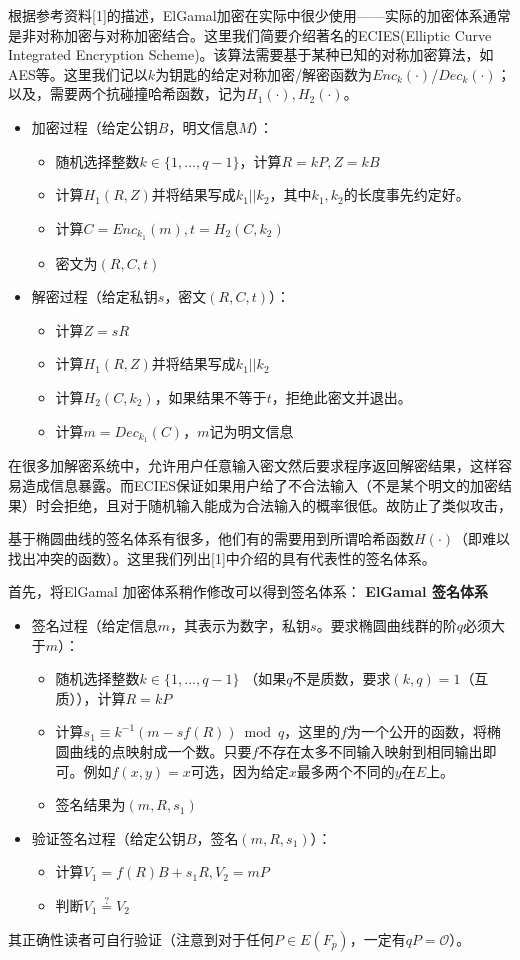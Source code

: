 \documentclass[12pt]{article}
\newcommand{\ec}{椭圆曲线}
\newcommand{\oo}{\mathcal{O}}
\begin{document}
根据参考资料[1]的描述，ElGamal加密在实际中很少使用——实际的加密体系通常是非对称加密与对称加密结合。这里我们简要介绍著名的ECIES(Elliptic Curve Integrated Encryption Scheme)。该算法需要基于某种已知的对称加密算法，如AES等。这里我们记以$k$为钥匙的给定对称加密/解密函数为$Enc_k(\cdot)$/$Dec_k(\cdot)$；以及，需要两个抗碰撞哈希函数，记为$H_1(\cdot),H_2(\cdot)$。
\begin{itemize}
	\item 加密过程（给定公钥$B$，明文信息$M$）：
	\begin{itemize}
		\item 随机选择整数$k \in \{1,...,q-1\}$，计算$R=kP, Z=kB$
        \item 计算$H_1(R,Z)$并将结果写成$k_1||k_2$，其中$k_1,k_2$的长度事先约定好。
        \item 计算$C=Enc_{k_1}(m),t = H_2(C,k_2)$
        \item 密文为$(R,C,t)$
   \end{itemize}
	\item 解密过程（给定私钥$s$，密文$(R,C,t)$）：
	\begin{itemize}
		\item 计算$Z=	sR$
		\item 计算$H_1(R,Z)$并将结果写成$k_1||k_2$
		\item 计算$H_2(C,k_2)$，如果结果不等于$t$，拒绝此密文并退出。
		\item 计算$m=Dec_{k_1}(C)$，$m$记为明文信息
	\end{itemize}
\end{itemize}
在很多加解密系统中，允许用户任意输入密文然后要求程序返回解密结果，这样容易造成信息暴露。而ECIES保证如果用户给了不合法输入（不是某个明文的加密结果）时会拒绝，且对于随机输入能成为合法输入的概率很低。故防止了类似攻击，

基于\ec 的签名体系有很多，他们有的需要用到所谓哈希函数$H(\cdot)$（即难以找出冲突的函数）。这里我们列出[1]中介绍的具有代表性的签名体系。

首先，将ElGamal 加密体系稍作修改可以得到签名体系：
\textbf{ElGamal 签名体系}
\begin{itemize}
	\item 签名过程（给定信息$m$，其表示为数字，私钥$s$。要求\ec 群的阶$q$必须大于$m$）：
	\begin{itemize}
		\item 随机选择整数$k \in \{1,...,q-1\}$ （如果$q$不是质数，要求$(k,q)=1$（互质）），计算$R=kP$
		\item 计算$s_1 \equiv k^{-1}(m-sf(R)) \bmod q$，这里的$f$为一个公开的函数，将\ec 的点映射成一个数。只要$f$不存在太多不同输入映射到相同输出即可。例如$f(x,y)=x$可选，因为给定$x$最多两个不同的$y$在$E$上。
		\item 签名结果为$(m,R,s_1)$
	\end{itemize}
	\item 验证签名过程（给定公钥$B$，签名$(m,R,s_1)$）：
	\begin{itemize}
		\item 计算$V_1=f(R)B+s_1R,V_2=mP$
		\item 判断$V_1 \overset{?}{=} V_2$
	\end{itemize}
\end{itemize}
其正确性读者可自行验证（注意到对于任何$P \in E(F_p)$，一定有$qP=\oo$）。
\end{document}
